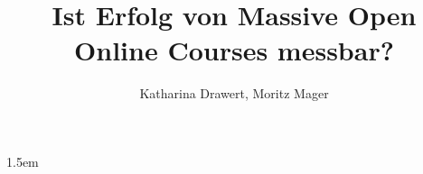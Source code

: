 \documentclass[man,floatsintext,donotrepeattitle,a4paper]{apa6}
\author{Katharina Drawert, Moritz Mager}
\affiliation{Leuphana Universität Lüneburg}
\title{Ist Erfolg von Massive Open Online Courses messbar?}
\makeatletter
\def\flushboth{%
      \let\\\@normalcr
        \@rightskip\z@skip \rightskip\@rightskip
          \leftskip\z@skip
            \parindent 1.5em\relax}
\makeatother
\begin{document}
\maketitle
\flushboth






\listoffigures 
\listoftables
\printbibliography
\end{document}
